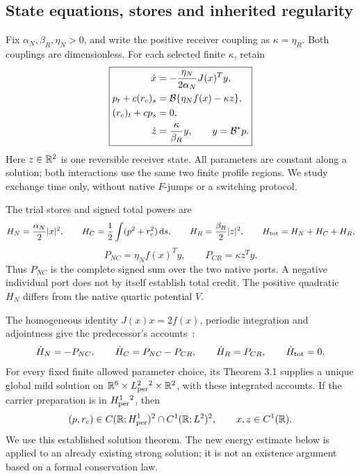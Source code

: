 \subsection{State equations, stores and inherited regularity}\label{sec:equations}
Fix $\alpha_N,\beta_R,\eta_N>0$, and write the positive receiver coupling as $\kappa=\eta_R$. Both couplings are dimensionless. For each selected finite $\kappa$, retain
\begin{equation}\label{eq:system}
\boxed{\begin{aligned}
\dot x&=-\frac{\eta_N}{2\alpha_N}J(x)^Ty,\\
p_t+c(r_c)_s&=\mathcal B\{\eta_N f(x)-\kappa z\},\\
(r_c)_t+cp_s&=0,\\
\dot z&=\frac{\kappa}{\beta_R}y,\qquad y=\mathcal B^*p.
\end{aligned}}
\end{equation}
Here $z\in\mathbb R^2$ is one reversible receiver state. All parameters are constant along a solution; both interactions use the same two finite profile regions. We study exchange time only, without native $F$-jumps or a switching protocol.

The trial stores and signed total powers are
\begin{equation}\label{eq:storages}
H_N=\frac{\alpha_N}{2}|x|^2,\qquad
H_C=\frac12\int(p^2+r_c^2)\,\mathrm d s,\qquad
H_R=\frac{\beta_R}{2}|z|^2,\qquad H_{\rm tot}=H_N+H_C+H_R,
\end{equation}
\begin{equation}\label{eq:powers}
P_{NC}=\eta_N f(x)^Ty,\qquad P_{CR}=\kappa z^Ty.
\end{equation}
Thus $P_{NC}$ is the complete signed sum over the two native ports. A negative individual port does not by itself establish total credit. The positive quadratic $H_N$ differs from the native quartic potential $V$.

The homogeneous identity $J(x)x=2f(x)$, periodic integration and adjointness give the predecessor's accounts~\cite[Section 2]{baseline}:
\begin{equation}\label{eq:balances}
\dot H_N=-P_{NC},\qquad
\dot H_C=P_{NC}-P_{CR},\qquad
\dot H_R=P_{CR},\qquad \dot H_{\rm tot}=0.
\end{equation}
For every fixed finite allowed parameter choice, its Theorem 3.1 supplies a unique global mild solution on
$\mathbb R^6\times L^2_{\rm per}{}^2\times\mathbb R^2$, with these integrated accounts. If the carrier preparation is in $H^1_{\rm per}{}^2$, then
\begin{equation}\label{eq:regularity}
(p,r_c)\in C(\mathbb R;H^1_{\rm per})^2\cap C^1(\mathbb R;L^2)^2,\qquad x,z\in C^1(\mathbb R).
\end{equation}
We use this established solution theorem. The new energy estimate below is applied to an already existing strong solution; it is not an existence argument based on a formal conservation law.

